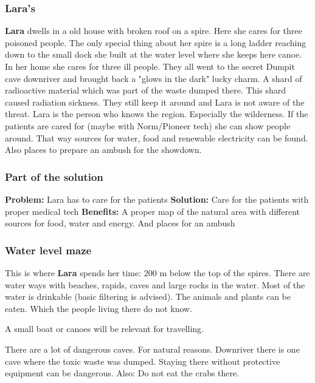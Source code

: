 \subsubsection{Lara's}

\textbf{Lara} dwells in a old house with broken roof on a spire. Here she cares for three poisoned people. The only special thing about her spire is a long ladder reaching down to the small dock she built at the water level where she keeps here canoe.
In her home she cares for three ill people. They all went to the secret Dumpit cave downriver and brought back a "glows in the dark" lucky charm. A shard of radioactive material which was part of the waste dumped there. This shard caused radiation sickness. They still keep it around and Lara is not aware of the threat.
Lara is the person who knows the region. Especially the wilderness. If the patients are cared for (maybe with Norm/Pioneer tech) she can show people around. That way sources for water, food and renewable electricity can be found. Also places to prepare an ambush for the showdown.

\subsubsection{Part of the solution}

\textbf{Problem:} Lara has to care for the patients
\textbf{Solution:} Care for the patients with proper medical tech
\textbf{Benefits:} A proper map of the natural area with different sources for food, water and energy. And places for an ambush

\subsubsection{Water level maze}

This is where \textbf{Lara} spends her time: 200 m below the top of the spires. There are water ways with beaches, rapids, caves and large rocks in the water. Most of the water is drinkable (basic filtering is advised). The animals and plants can be eaten. Which the people living there do not know.

A small boat or canoes will be relevant for travelling.

There are a lot of dangerous caves. For natural reasons. Downriver there is one cave where the toxic waste was dumped. Staying there without protective equipment can be dangerous. Also: Do not eat the crabs there.


